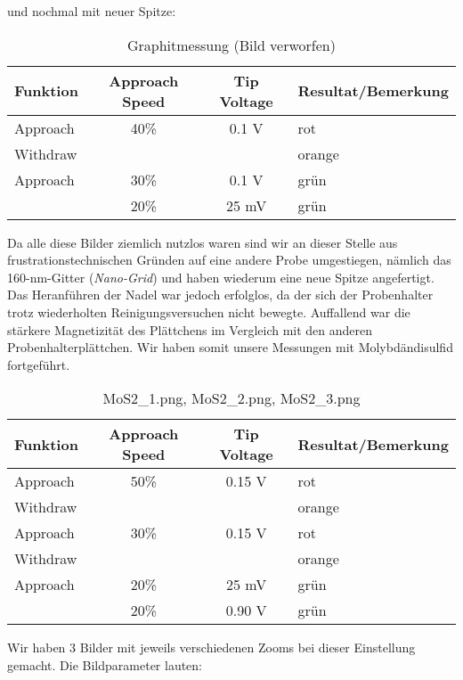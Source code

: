 
und nochmal mit neuer Spitze:

\begin{table}[H]
\caption{Graphitmessung (Bild verworfen)}
\centering \begin{tabular}[H]{l c c l} 
Funktion & Approach Speed & Tip Voltage & Resultat/Bemerkung\\ \hline
Approach & 40\% & 0.1 V & rot\\
Withdraw & & & orange\\
Approach & 30\% & 0.1 V & grün\\
 & 20\% & 25 mV & grün\\
\end{tabular}
\end{table}


Da alle diese Bilder ziemlich nutzlos waren sind wir an dieser Stelle aus frustrationstechnischen Gründen auf eine andere Probe umgestiegen, nämlich das 160-nm-Gitter (\emph{Nano-Grid}) und haben wiederum eine neue Spitze angefertigt. Das Heranführen der Nadel war jedoch erfolglos, da der sich der Probenhalter trotz wiederholten Reinigungsversuchen nicht bewegte. Auffallend war die stärkere Magnetizität des Plättchens im Vergleich mit den anderen Probenhalterplättchen. Wir haben somit unsere Messungen mit Molybdändisulfid fortgeführt.

\begin{table}[H]
\caption{MoS2\_1.png, MoS2\_2.png, MoS2\_3.png}
\centering \begin{tabular}[H]{l c c l} 
Funktion & Approach Speed & Tip Voltage & Resultat/Bemerkung\\ \hline
Approach & 50\% & 0.15 V & rot\\
Withdraw & & & orange\\
Approach & 30\% & 0.15 V & rot\\
Withdraw & & & orange\\
Approach & 20\% & 25 mV & grün\\
 & 20\% & 0.90 V & grün\\
\end{tabular}
\end{table}

Wir haben 3 Bilder mit jeweils verschiedenen Zooms bei dieser Einstellung gemacht. Die Bildparameter lauten:



